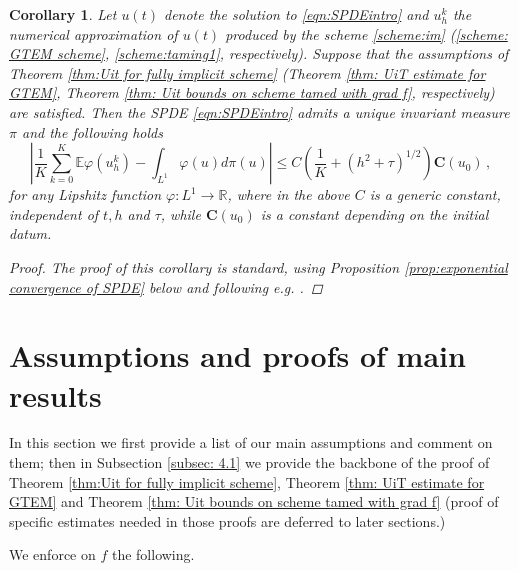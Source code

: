 \documentclass[reqno, 11pt]{amsart}
\theoremstyle{plain}
\newtheorem{corollary}[theorem]{Corollary}
\theoremstyle{definition}
\theoremstyle{remark}
\numberwithin{equation}{section}
\numberwithin{theorem}{section}
\newcommand{\R}{\mathbb{R}}
\newcommand{\con}{\mathbf{C}}
\begin{document}
{\begin{corollary}
    Let $u(t)$ denote the solution to \eqref{eqn:SPDEintro} and $u_h^k$ the numerical approximation of $u(t)$ produced by the scheme \eqref{scheme:im} (\eqref{scheme: GTEM scheme}, \eqref{scheme:taming1}, respectively). Suppose that the assumptions of Theorem \ref{thm:Uit for fully implicit scheme} (Theorem \ref{thm: UiT estimate for GTEM}, Theorem \ref{thm: Uit bounds on scheme tamed with grad f}, respectively) are satisfied. Then the SPDE \eqref{eqn:SPDEintro} admits a unique invariant measure $\pi$ and  the following holds
    $$
  \left \vert \frac1K \sum_{k=0}^{K}  \mathbb E \varphi(u_h^k) - \int_{L^{1}} \varphi(u) d\pi(u) \right \vert \leq C\left( \frac{1}{K} + (h^2+\tau)^{1/2} \right) \con(u_0) \,,
    $$
    for any Lipshitz function $\varphi:L^1 \rightarrow \R$,  where in the above $C$ is a generic constant, independent of $t, h$ and $\tau$, while $\con(u_0)$ is a constant depending on the initial datum.
\begin{proof}
    The proof of this corollary is standard, using Proposition \ref{prop:exponential convergence of SPDE} below and following e.g. \cite[Corollary 3.6]{crisan2021uniform}. 
\end{proof}
    
\end{corollary}











\section{Assumptions and proofs of main results}\label{sec: proof of main results}
In this section we first provide a list of our main assumptions and comment on them; then in Subsection \ref{subsec: 4.1} we provide the backbone of the proof of   Theorem \ref{thm:Uit for fully implicit scheme}, Theorem \ref{thm: UiT estimate for GTEM} and Theorem \ref{thm: Uit bounds on scheme tamed with grad f} (proof of specific estimates needed in those proofs are deferred to later sections.) 

We enforce on $f$  the following. 

}
\end{document}
